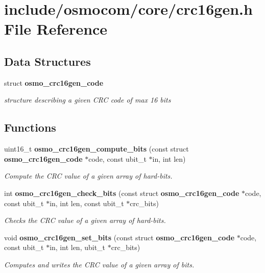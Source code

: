 \section{include/osmocom/core/crc16gen.h File Reference}
\label{crc16gen_8h}
\subsection*{Data Structures}
\begin{DoxyCompactItemize}
\item 
struct {\bf osmo\-\_\-crc16gen\-\_\-code}
\begin{DoxyCompactList}\small\item\em structure describing a given C\-R\-C code of max 16 bits \end{DoxyCompactList}\end{DoxyCompactItemize}
\subsection*{Functions}
\begin{DoxyCompactItemize}
\item 
uint16\-\_\-t {\bf osmo\-\_\-crc16gen\-\_\-compute\-\_\-bits} (const struct {\bf osmo\-\_\-crc16gen\-\_\-code} $\ast$code, const ubit\-\_\-t $\ast$in, int len)
\begin{DoxyCompactList}\small\item\em Compute the C\-R\-C value of a given array of hard-\/bits. \end{DoxyCompactList}\item 
int {\bf osmo\-\_\-crc16gen\-\_\-check\-\_\-bits} (const struct {\bf osmo\-\_\-crc16gen\-\_\-code} $\ast$code, const ubit\-\_\-t $\ast$in, int len, const ubit\-\_\-t $\ast$crc\-\_\-bits)
\begin{DoxyCompactList}\small\item\em Checks the C\-R\-C value of a given array of hard-\/bits. \end{DoxyCompactList}\item 
void {\bf osmo\-\_\-crc16gen\-\_\-set\-\_\-bits} (const struct {\bf osmo\-\_\-crc16gen\-\_\-code} $\ast$code, const ubit\-\_\-t $\ast$in, int len, ubit\-\_\-t $\ast$crc\-\_\-bits)
\begin{DoxyCompactList}\small\item\em Computes and writes the C\-R\-C value of a given array of bits. \end{DoxyCompactList}\end{DoxyCompactItemize}
